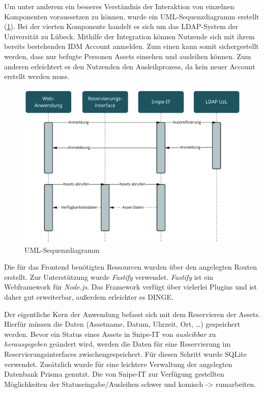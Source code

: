 Um unter anderem ein besseres Verständnis der Interaktion von einzelnen
Komponenten voraussetzen zu können, wurde ein UML-Sequenzdiagramm erstellt
(\ref{fig:uml}). Bei der vierten Komponente handelt es sich um das LDAP-System
der Universität zu Lübeck. Mithilfe der Integration können Nutzende sich mit
ihrem bereits bestehenden IDM Account anmelden. Zum einen kann somit
sichergestellt werden, dass nur befugte Personen Assets einsehen und ausleihen
können. Zum anderen erleichtert es den Nutzenden den Ausleihprozess, da kein
neuer Account erstellt werden muss.

\begin{figure}[h]
  \centering
  \includegraphics[scale=0.45]{Bilder/uml.pdf}
  \caption[UML-Sequenzdiagramm]{UML-Sequenzdiagramm}
  \label{fig:uml}
\end{figure}

Die für das Frontend benötigten Ressourcen wurden über den angelegten Routen
erstellt. Zur Unterstützung wurde \textit{Fastify} verwendet. \textit{Fastify}
ist ein Webframework für \textit{Node.js}. Das Framework verfügt über vielerlei
Plugins und ist daher gut erweiterbar, außerdem erleichter es DINGE.

Der eigentliche Kern der Anwendung befasst sich mit dem Reservieren der Assets.
Hierfür müssen die Daten (Assetname, Datum, Uhrzeit, Ort, \dots) gespeichert
werden. Bevor ein Status eines Assets in Snipe-IT von \textit{ausleihbar} zu
\textit{herausgegeben} geändert wird, werden die Daten für eine Reservierung im
Reservierungsinterfaces zwischengespeichert. Für diesen Schritt wurde SQLite
verwendet. Zusätzlich wurde für eine leichtere Verwaltung der angelegten
Datenbank Prisma genutzt. Die von Snipe-IT zur Verfügung gestellten
Möglichkeiten der Statuseingabe/Ausleihen schwer und komisch -> rumarbeiten.

